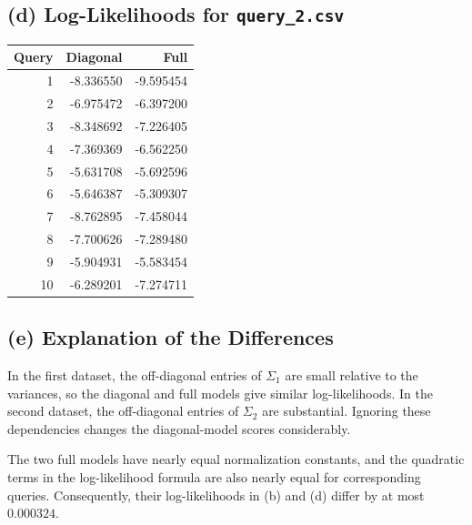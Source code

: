 \documentclass[11pt]{article}
\begin{document}
\subsection*{(d) Log-Likelihoods for \texttt{query\_2.csv}}

\begin{center}
\begin{tabular}{rrr}
\toprule
Query & Diagonal & Full \\
\midrule
1  & -8.336550 & -9.595454 \\
2  & -6.975472 & -6.397200 \\
3  & -8.348692 & -7.226405 \\
4  & -7.369369 & -6.562250 \\
5  & -5.631708 & -5.692596 \\
6  & -5.646387 & -5.309307 \\
7  & -8.762895 & -7.458044 \\
8  & -7.700626 & -7.289480 \\
9  & -5.904931 & -5.583454 \\
10 & -6.289201 & -7.274711 \\
\bottomrule
\end{tabular}
\end{center}

\subsection*{(e) Explanation of the Differences}

In the first dataset, the off-diagonal entries of $\Sigma_1$ are small relative to the variances, so the diagonal and full models give similar log-likelihoods. In the second dataset, the off-diagonal entries of $\Sigma_2$ are substantial. Ignoring these dependencies changes the diagonal-model scores considerably.

The two full models have nearly equal normalization constants, and the quadratic terms in the log-likelihood formula are also nearly equal for corresponding queries. Consequently, their log-likelihoods in (b) and (d) differ by at most $0.000324$.
\end{document}
